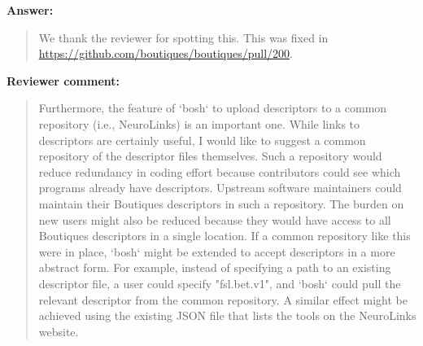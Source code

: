 \documentclass[a4]{article}
\newenvironment{review}%
{\textbf{Reviewer comment:}\begin{quote}}%
{\end{quote}}%
\newenvironment{answer}%
{\textbf{Answer:}\begin{quote}}%
{\end{quote}}%
\begin{document}
\begin{answer}
  We thank the reviewer for spotting this. This was fixed in
  \url{https://github.com/boutiques/boutiques/pull/200}.
\end{answer}

\begin{review}
Furthermore, the feature of `bosh` to upload descriptors to a common repository (i.e., NeuroLinks) is an important one. While links to descriptors are certainly useful, I would like to suggest a common repository of the descriptor files themselves. Such a repository would reduce redundancy in coding effort because contributors could see which programs already have descriptors. Upstream software maintainers could maintain their Boutiques descriptors in such a repository. The burden on new users might also be reduced because they would have access to all Boutiques descriptors in a single location. If a common repository like this were in place, `bosh` might be extended to accept descriptors in a more abstract form. For example, instead of specifying a path to an existing descriptor file, a user could specify "fsl.bet.v1", and `bosh` could pull the relevant descriptor from the common repository. A similar effect might be achieved using the existing JSON file that lists the
tools on the NeuroLinks website.
\end{review}
\end{document}
